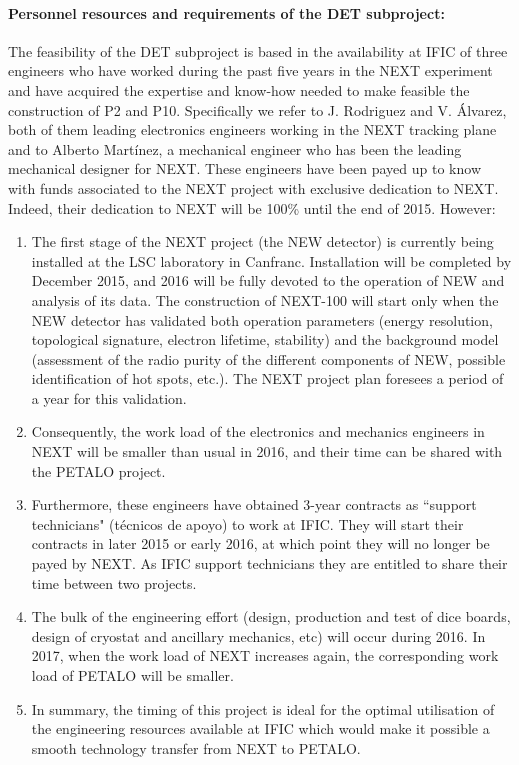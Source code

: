 \paragraph{Personnel resources and requirements of the DET subproject:}

The feasibility of the DET subproject is based in the availability at IFIC of three engineers who have worked during the past five years in the NEXT experiment and have acquired the expertise and know-how needed to make feasible the construction of P2 and P10. Specifically we refer to J. Rodriguez and V. Álvarez, both of them leading electronics engineers working in the NEXT tracking plane and to Alberto Martínez, a mechanical engineer who has been the leading mechanical designer for NEXT.
These engineers have been payed up to know with funds associated to the NEXT project with exclusive dedication to NEXT. Indeed, their dedication to NEXT will be 100\% until the end of 2015. However:

\begin{enumerate}
\item The first stage of the NEXT project (the NEW detector) is currently being installed at the LSC laboratory in Canfranc. Installation will be completed by December 2015, and 2016 will be fully devoted to the operation of NEW and analysis of its data. The construction of NEXT-100 will start only when the NEW detector has validated both operation parameters (energy resolution, topological signature, electron lifetime, stability) and the background model (assessment of the radio purity of the different components of NEW, possible identification of hot spots, etc.). The NEXT project plan foresees a period of a year for this validation.
\item Consequently, the work load of the electronics and mechanics engineers in NEXT will be smaller than usual in 2016, and their time can be shared with the PETALO project.
\item Furthermore, these engineers have obtained 3-year contracts as ``support technicians" (técnicos de apoyo) to work at IFIC. They will start their contracts in later 2015 or early 2016, at which point they will no longer be payed by NEXT. As IFIC support technicians they are entitled to share their time between two projects. 
\item The bulk of the engineering effort (design, production and test of dice boards, design of cryostat and ancillary mechanics, etc) will occur during 2016. In 2017, when the work load of NEXT increases again, the corresponding work load of PETALO will be smaller. 
\item In summary, the timing of this project is ideal for the optimal utilisation of the engineering resources available at IFIC which would make it possible a smooth technology transfer from NEXT to PETALO. 
\end{enumerate}

